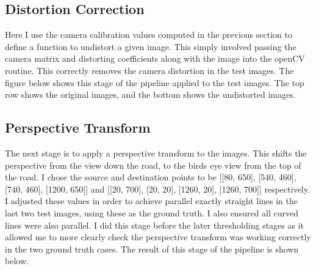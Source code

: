 \documentclass[letterpaper,12pt]{article}
\begin{document}
\subsection{Distortion Correction}
Here I use the camera calibration values computed in the previous section to define a function to undistort a given image. This simply involved passing the camera matrix and distorting coefficients along with the image into the openCV routine. This correctly removes the camera distortion in the test images. The figure below shows this stage of the pipeline applied to the test images. The top row shows the original images, and the bottom shows the undistorted images. 
\FloatBarrier
\begin{figure}
\centering
{}
\end{figure}
\FloatBarrier
\subsection{Perspective Transform}
The next stage is to apply a perspective transform to the images. This shifts the perspective from the view down the road, to the birds eye view from the top of the road. I chose the source and destination points to be [[80, 650], [540, 460], [740, 460], [1200, 650]] and [[20, 700], [20, 20], [1260, 20], [1260, 700]] respectively. I adjusted these values in order to achieve parallel exactly straight lines in the last two test images, using these as the ground truth. I also ensured all curved lines were also parallel. I did this stage before the later thresholding stages as it allowed me to more clearly check the perspective transform was working correctly in the two ground truth cases. The result of this stage of the pipeline is shown below.
\FloatBarrier
\begin{figure}
\centering
{}
\end{figure}
\FloatBarrier
\end{document}
